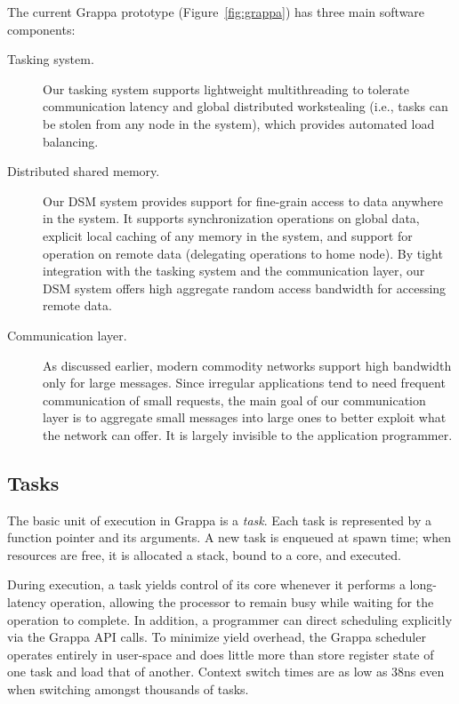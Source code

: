 The current Grappa prototype (Figure~\ref{fig:grappa}) has three main software components: \begin{description}

\item [Tasking system.] Our tasking system supports lightweight multithreading to tolerate communication latency and global distributed workstealing (i.e., tasks can be stolen from any node in the system), which provides automated load balancing.

\item[Distributed shared memory.] Our DSM system provides support for fine-grain access to data anywhere in the system. It supports synchronization operations on global data, explicit local caching of any memory in the system, and support for operation on remote data (delegating operations to home node). By tight integration with the tasking system and the communication layer, our DSM system offers high aggregate random access bandwidth for accessing remote data.

\item[Communication layer.] As discussed earlier, modern commodity networks support high bandwidth only for large messages. Since irregular applications tend to need frequent communication of small requests, the main goal of our communication layer is to aggregate small messages into large ones to better exploit what the network can offer. It is largely invisible to the application programmer.

\end{description}

\subsection{Tasks}

The basic unit of execution in Grappa is a {\em task}. Each task is represented by a function pointer and its arguments. A new task is enqueued at spawn time; when resources are free, it is allocated a stack, bound to a core, and executed.

During execution, a task yields control of its core whenever it performs a long-latency operation, allowing the processor to remain busy while waiting for the operation to complete.  In addition,  a programmer can direct scheduling explicitly via the Grappa API calls. To minimize yield overhead, the Grappa scheduler operates entirely in user-space and does little more than store register state of one task and load that of another. Context switch times are as low as 38ns even when switching amongst thousands of tasks.

